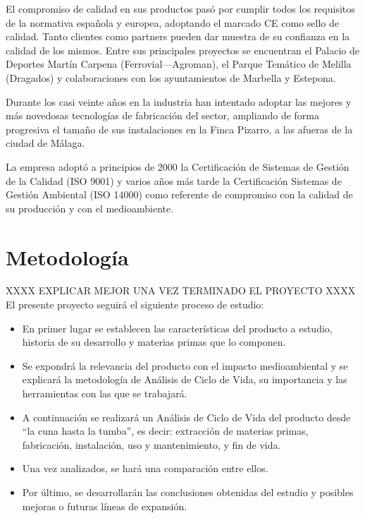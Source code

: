 El compromiso de calidad en sus productos pasó por cumplir todos los requisitos de la normativa española y europea, adoptando el marcado CE como sello de calidad. Tanto clientes como partners pueden dar muestra de su confianza en la calidad de los mismos. Entre sus principales proyectos se encuentran el Palacio de Deportes Martín Carpena (Ferrovial—Agroman), el Parque Temático de Melilla (Dragados) y colaboraciones con los ayuntamientos de Marbella y Estepona.

Durante los casi veinte años en la industria han intentado adoptar las mejores y más novedosas tecnologías de fabricación del sector, ampliando de forma progresiva el tamaño de sus instalaciones en la Finca Pizarro, a las afueras de la ciudad de Málaga.

La empresa adoptó a principios de 2000 la Certificación de Sistemas de Gestión de la Calidad (ISO 9001) y varios años más tarde la Certificación Sistemas de Gestión Ambiental (ISO 14000) como referente de compromiso con la calidad de su producción y con el medioambiente.

\section{Metodología}

XXXX EXPLICAR MEJOR UNA VEZ TERMINADO EL PROYECTO XXXX
El presente proyecto seguirá el siguiente proceso de estudio:

\begin{itemize}
  \item En primer lugar se establecen las características del producto a estudio, historia de su desarrollo y materias primas que lo componen.
  \item Se expondrá la relevancia del producto con el impacto medioambiental y se explicará la metodología de Análisis de Ciclo de Vida, su importancia y las herramientas con las que se trabajará.
  \item A continuación se realizará un Análisis de Ciclo de Vida del producto desde ``la cuna hasta la tumba'', es decir: extracción de materias primas, fabricación, instalación, uso y mantenimiento, y fin de vida.
  \item Una vez analizados, se hará una comparación entre ellos.
  \item Por último, se desarrollarán las conclusiones obtenidas del estudio y posibles mejoras o futuras líneas de expansión.
\end{itemize}
